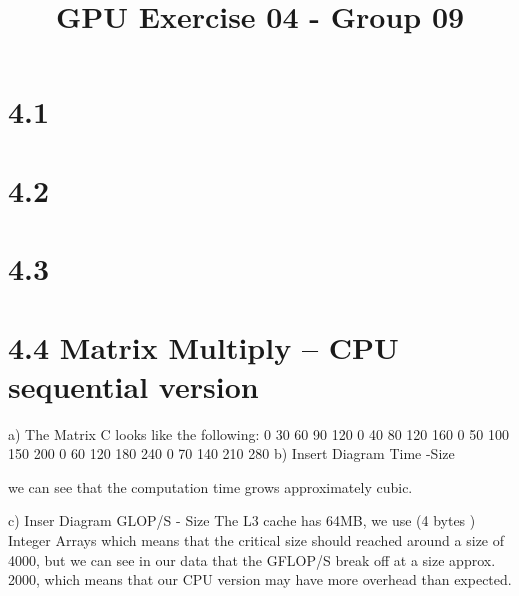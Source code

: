 \documentclass{report}
\begin{document}
\title{GPU Exercise 04 - Group 09}
\maketitle

\section*{4.1}
\section*{4.2}
\section*{4.3}
\section*{4.4 Matrix Multiply – CPU sequential version}
a) The Matrix C looks like the following:
0 30 60 90 120 
0 40 80 120 160 
0 50 100 150 200 
0 60 120 180 240 
0 70 140 210 280 
b)
Insert Diagram Time -Size

we can see that the computation time  grows approximately cubic.

c) 
Inser Diagram GLOP/S - Size
The L3 cache has 64MB, we use (4 bytes ) Integer Arrays which means that the critical size should reached around a size of 4000, but we can see in our data that
the GFLOP/S break off at a size approx. 2000, which means that our CPU version may have more overhead than expected.
\end{document}

